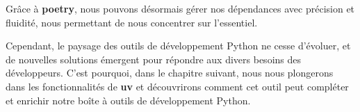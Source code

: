 \begin{center}
\end{center}

Grâce à \textbf{poetry}, nous pouvons désormais gérer nos dépendances avec précision et fluidité, nous permettant de nous concentrer sur l'essentiel.

Cependant, le paysage des outils de développement Python ne cesse d'évoluer, et de nouvelles solutions émergent pour répondre aux divers besoins des développeurs. C'est pourquoi, dans le chapitre suivant, nous nous plongerons dans les fonctionnalités de \textbf{uv} et découvrirons comment cet outil peut compléter et enrichir notre boîte à outils de développement Python. 

